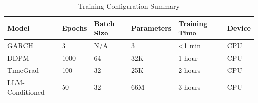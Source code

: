 \begin{table}
\caption{Training Configuration Summary}
\label{tab:training_config}
\begin{tabular}{llllll}
\toprule
Model & Epochs & Batch Size & Parameters & Training Time & Device \\
\midrule
GARCH & 3 & N/A & 3 & <1 min & CPU \\
DDPM & 1000 & 64 & 32K & 1 hour & CPU \\
TimeGrad & 100 & 32 & 25K & 2 hours & CPU \\
LLM-Conditioned & 50 & 32 & 66M & 3 hours & CPU \\
\bottomrule
\end{tabular}
\end{table}
